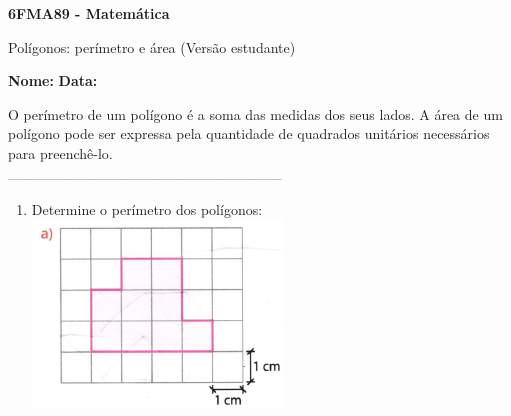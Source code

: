 \documentclass[a4paper,14pt]{article}
\begin{document}
	
	\noindent\textbf{6FMA89 - Matemática} 
	
	\begin{center}Polígonos: perímetro e área (Versão estudante)
	\end{center}
	
	\noindent\textbf{Nome:} \underline{\hspace{10cm}}
	\noindent\textbf{Data:} \underline{\hspace{4cm}}
	
	
	\begin{multicols}{2}
		\noindent O perímetro de um polígono é a soma das medidas dos seus lados. A área de um polígono pode ser expressa pela quantidade de quadrados unitários necessários para preenchê-lo. \\
		\noindent\textsubscript{-----------------------------------------------------------------------}
		\begin{enumerate} 
			\item Determine o perímetro dos polígonos: \\
			\includegraphics[width=1\linewidth]{6FMA89_imagens/imagem01} \\\\\\\\\\

\end{enumerate}
\end{multicols}
\end{document}
